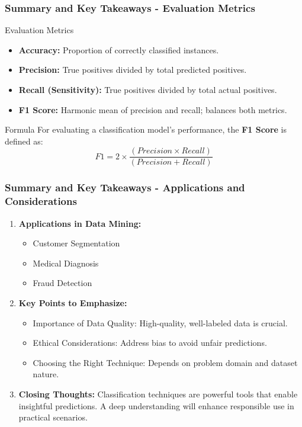 \documentclass[aspectratio=169]{beamer}
\begin{document}
\begin{frame}[fragile]
    \frametitle{Summary and Key Takeaways - Evaluation Metrics}
    \begin{block}{Evaluation Metrics}
        \begin{itemize}
            \item \textbf{Accuracy:} Proportion of correctly classified instances.
            \item \textbf{Precision:} True positives divided by total predicted positives.
            \item \textbf{Recall (Sensitivity):} True positives divided by total actual positives.
            \item \textbf{F1 Score:} Harmonic mean of precision and recall; balances both metrics.
        \end{itemize}
    \end{block}

    \begin{block}{Formula}
        For evaluating a classification model's performance, the \textbf{F1 Score} is defined as:
        \begin{equation}
        F1 = 2 \times \frac{(Precision \times Recall)}{(Precision + Recall)}
        \end{equation}
    \end{block}
\end{frame}

\begin{frame}[fragile]
    \frametitle{Summary and Key Takeaways - Applications and Considerations}
    \begin{enumerate}
        \item \textbf{Applications in Data Mining:}
        \begin{itemize}
            \item Customer Segmentation
            \item Medical Diagnosis
            \item Fraud Detection
        \end{itemize}

        \item \textbf{Key Points to Emphasize:}
        \begin{itemize}
            \item Importance of Data Quality: High-quality, well-labeled data is crucial.
            \item Ethical Considerations: Address bias to avoid unfair predictions.
            \item Choosing the Right Technique: Depends on problem domain and dataset nature.
        \end{itemize}
        
        \item \textbf{Closing Thoughts:} Classification techniques are powerful tools that enable insightful predictions. A deep understanding will enhance responsible use in practical scenarios.
    \end{enumerate}
\end{frame}
\end{document}
